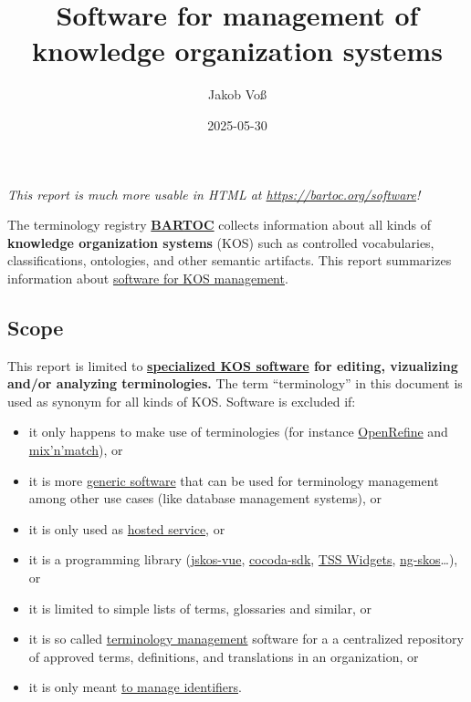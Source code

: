 \documentclass[
  DIV=10]{article}
\title{Software for management of knowledge organization systems}
\author{Jakob Voß}
\affil{%
                  Verbundzentrale des GBV (VZG)
              }
\date{2025-05-30}
\providecommand{\tightlist}{%
  \setlength{\itemsep}{0pt}\setlength{\parskip}{0pt}}
\begin{document}
\maketitle


\large

\emph{This report is much more usable in HTML at
\url{https://bartoc.org/software}!} \vspace*{20mm}

The terminology registry \textbf{\href{https://bartoc.org/}{BARTOC}}
collects information about all kinds of \textbf{knowledge organization
systems} (KOS) such as controlled vocabularies, classifications,
ontologies, and other semantic artifacts. This report summarizes
information about \hyperref[kos-software]{software for KOS management}.

\subsection{Scope}\label{scope}

This report is limited to \textbf{\hyperref[kos-software]{specialized
KOS software} for editing, vizualizing and/or analyzing terminologies.}
The term ``terminology'' in this document is used as synonym for all
kinds of KOS. Software is excluded if:

\begin{itemize}
\tightlist
\item
  it only happens to make use of terminologies (for instance
  \href{https://openrefine.org/}{OpenRefine} and
  \href{https://mix-n-match.toolforge.org/}{mix'n'match}), or
\item
  it is more \hyperref[generic-software]{generic software} that can be
  used for terminology management among other use cases (like database
  management systems), or
\item
  it is only used as \hyperref[hosted-services]{hosted service}, or
\item
  it is a programming library
  (\href{https://github.com/gbv/jskos-vue/}{jskos-vue},
  \href{https://github.com/gbv/cocoda-sdk/}{cocoda-sdk},
  \href{https://github.com/ts4nfdi/terminology-service-suite}{TSS
  Widgets}, \href{http://gbv.github.io/ng-skos/}{ng-skos}\ldots), or
\item
  it is limited to simple lists of terms, glossaries and similar, or
\item
  it is so called \hyperref[terminology-management]{terminology
  management} software for a a centralized repository of approved terms,
  definitions, and translations in an organization, or
\item
  it is only meant \hyperref[identifier-systems]{to manage identifiers}.
\end{itemize}
\end{document}
